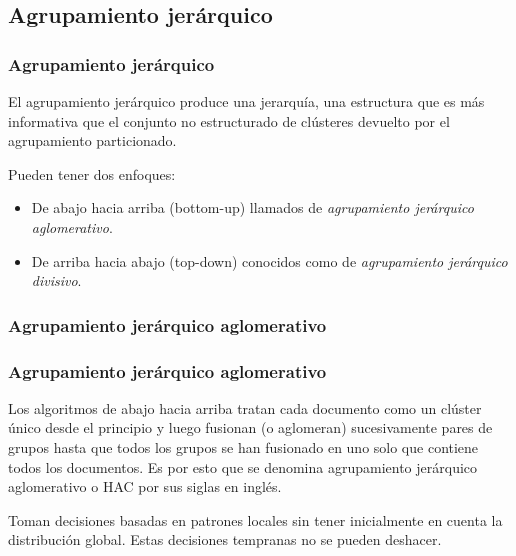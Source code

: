 \documentclass[t,compress,10pt,xcolor=dvipsnames]{beamer}
\begin{document}
	\subsection{Agrupamiento jer\'arquico}
	\frame
	{
		\frametitle{Agrupamiento jer\'arquico}
		\vspace{2em}
		El agrupamiento jerárquico produce una jerarquía, una estructura que es más informativa que el conjunto no estructurado de clústeres devuelto por el agrupamiento particionado.
		
		\vspace{1em}
		Pueden tener dos enfoques: 
		\begin{itemize}
			\item De abajo hacia arriba (bottom-up) llamados de \textit{agrupamiento jer\'arquico aglomerativo}. 
			\item De arriba hacia abajo (top-down) conocidos como de \textit{agrupamiento jer\'arquico divisivo}. 
		\end{itemize}
	}
	
	
	\subsubsection{Agrupamiento jer\'arquico aglomerativo}
	\frame
	{
		\frametitle{Agrupamiento jer\'arquico aglomerativo}
		\vspace{3em}
		Los algoritmos de abajo hacia arriba tratan cada documento como un clúster único desde el principio y luego fusionan (o aglomeran) sucesivamente pares de grupos hasta que todos los grupos se han fusionado en uno solo que contiene todos los documentos. 
		Es por esto que se denomina agrupamiento jerárquico aglomerativo o HAC por sus siglas en ingl\'es. 
		
		\vspace{1em}
		Toman decisiones basadas en patrones locales sin tener inicialmente en cuenta la distribución global. Estas decisiones tempranas no se pueden deshacer.
	}
\end{document}
